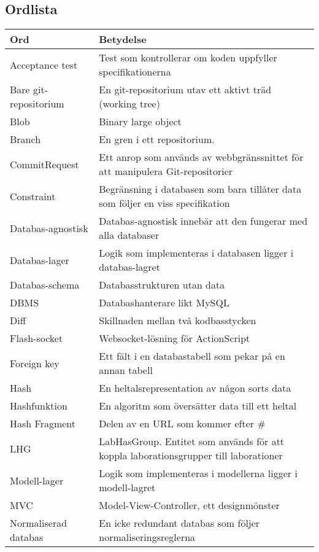 \subsection{Ordlista}
\label{sec:ordlista}
\small
\begin{tabular} { | l | p{10cm} | }
\hline
\bf{Ord} & \bf{Betydelse} \\
\hline
Acceptance test	& Test som kontrollerar om koden uppfyller specifikationerna \\
\hline
Bare git-repositorium & En git-repositorium utav ett aktivt träd (working tree) \\
\hline
Blob & Binary large object \\
\hline
Branch & En gren i ett repositorium. \\
\hline
CommitRequest & Ett anrop som används av webbgränssnittet för att manipulera Git-repositorier \\
\hline
Constraint & Begränsning i databasen som bara tillåter data som följer en viss specifikation \\
\hline
Databas-agnostisk & Databas-agnostisk innebär att den fungerar med alla databaser \\
\hline
Databas-lager & Logik som implementeras i databasen ligger i databas-lagret \\
\hline
Databas-schema & Databasstrukturen utan data \\
\hline
DBMS & Databashanterare likt MySQL \\
\hline
Diff & Skillnaden mellan två kodbasstycken \\
\hline
Flash-socket & Websocket-lösning för ActionScript \\
\hline
Foreign key & Ett fält i en databastabell som pekar på en annan tabell \\
\hline
Hash & En heltalsrepresentation av någon sorts data \\
\hline
Hashfunktion & En algoritm som översätter data till ett heltal \\
\hline
Hash Fragment & Delen av en URL som kommer efter \# \\
\hline
LHG & LabHasGroup. Entitet som används för att koppla laborationsgrupper till laborationer \\
\hline
Modell-lager & Logik som implementeras i modellerna ligger i modell-lagret \\
\hline
MVC & Model-View-Controller, ett designmönster \\
\hline
Normaliserad databas & En icke redundant databas som följer normaliseringsreglerna \\

\end{tabular}
